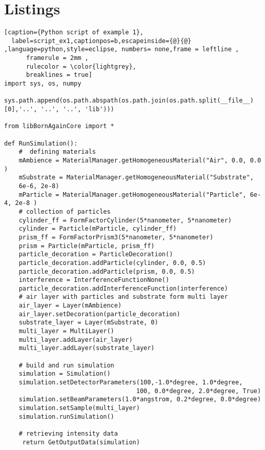 \newpage{\pagestyle{empty}\cleardoublepage}



\chapter{Listings}

\begin{lstlisting}[caption={Python script of example 1},
  label=script_ex1,captionpos=b,escapeinside={@}{@} ,language=python,style=eclipse, numbers= none,frame = leftline ,
      framerule = 2mm ,
      rulecolor = \color{lightgrey},
      breaklines = true]
import sys, os, numpy 

sys.path.append(os.path.abspath(os.path.join(os.path.split(__file__)[0],'..', '..', '..', 'lib')))

from libBornAgainCore import * 

def RunSimulation():
    #  defining materials 
    mAmbience = MaterialManager.getHomogeneousMaterial("Air", 0.0, 0.0 ) 
    mSubstrate = MaterialManager.getHomogeneousMaterial("Substrate",
    6e-6, 2e-8) 
    mParticle = MaterialManager.getHomogeneousMaterial("Particle", 6e-4, 2e-8 )
    # collection of particles 
    cylinder_ff = FormFactorCylinder(5*nanometer, 5*nanometer) 
    cylinder = Particle(mParticle, cylinder_ff) 
    prism_ff = FormFactorPrism3(5*nanometer, 5*nanometer) 
    prism = Particle(mParticle, prism_ff) 
    particle_decoration = ParticleDecoration()  
    particle_decoration.addParticle(cylinder, 0.0, 0.5)  
    particle_decoration.addParticle(prism, 0.0, 0.5)  
    interference = InterferenceFunctionNone()  
    particle_decoration.addInterferenceFunction(interference)  
    # air layer with particles and substrate form multi layer 
    air_layer = Layer(mAmbience)  
    air_layer.setDecoration(particle_decoration)
    substrate_layer = Layer(mSubstrate, 0) 
    multi_layer = MultiLayer()  
    multi_layer.addLayer(air_layer) 
    multi_layer.addLayer(substrate_layer) 

    # build and run simulation  
    simulation = Simulation()  
    simulation.setDetectorParameters(100,-1.0*degree, 1.0*degree, 
                                    100, 0.0*degree, 2.0*degree, True) 
    simulation.setBeamParameters(1.0*angstrom, 0.2*degree, 0.0*degree) 
    simulation.setSample(multi_layer) 
    simulation.runSimulation()  

    # retrieving intensity data
     return GetOutputData(simulation)
\end{lstlisting}


